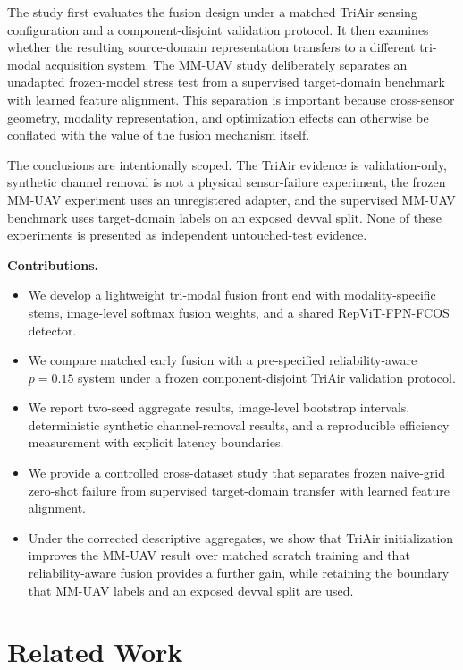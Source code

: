 \documentclass[pdflatex,sn-basic,Numbered,iicol]{sn-jnl}
\begin{document}
The study first evaluates the fusion design under a matched TriAir sensing configuration and a component-disjoint validation protocol. It then examines whether the resulting source-domain representation transfers to a different tri-modal acquisition system. The MM-UAV study deliberately separates an unadapted frozen-model stress test from a supervised target-domain benchmark with learned feature alignment. This separation is important because cross-sensor geometry, modality representation, and optimization effects can otherwise be conflated with the value of the fusion mechanism itself.

The conclusions are intentionally scoped. The TriAir evidence is validation-only, synthetic channel removal is not a physical sensor-failure experiment, the frozen MM-UAV experiment uses an unregistered adapter, and the supervised MM-UAV benchmark uses target-domain labels on an exposed devval split. None of these experiments is presented as independent untouched-test evidence.

\noindent\textbf{Contributions.}
\begin{itemize}
    \item We develop a lightweight tri-modal fusion front end with modality-specific stems, image-level softmax fusion weights, and a shared RepViT-FPN-FCOS detector.
    \item We compare matched early fusion with a pre-specified reliability-aware $p=0.15$ system under a frozen component-disjoint TriAir validation protocol.
    \item We report two-seed aggregate results, image-level bootstrap intervals, deterministic synthetic channel-removal results, and a reproducible efficiency measurement with explicit latency boundaries.
    \item We provide a controlled cross-dataset study that separates frozen naive-grid zero-shot failure from supervised target-domain transfer with learned feature alignment.
    \item Under the corrected descriptive aggregates, we show that TriAir initialization improves the MM-UAV result over matched scratch training and that reliability-aware fusion provides a further gain, while retaining the boundary that MM-UAV labels and an exposed devval split are used.
\end{itemize}

\section{Related Work}
\end{document}
